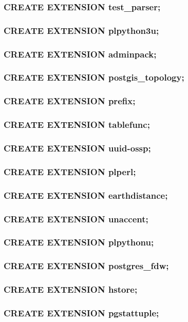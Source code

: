 \documentclass[utf8,hyperref={pdftex,colorlinks,linkcolor=black,citecolor=black,urlcolor=black,filecolor=black,plainpages=false},xcolor=table,hyperref]{beamer}
\begin{document}
\begin{frame}
	\frametitle{CREATE EXTENSION test_parser;}
\end{frame}

\begin{frame}
	\frametitle{CREATE EXTENSION plpython3u;}
\end{frame}

\begin{frame}
	\frametitle{CREATE EXTENSION adminpack;}
\end{frame}

\begin{frame}
	\frametitle{CREATE EXTENSION postgis_topology;}
\end{frame}

\begin{frame}
	\frametitle{CREATE EXTENSION prefix;}
\end{frame}

\begin{frame}
	\frametitle{CREATE EXTENSION tablefunc;}
\end{frame}

\begin{frame}
	\frametitle{CREATE EXTENSION uuid-ossp;}
\end{frame}

\begin{frame}
	\frametitle{CREATE EXTENSION plperl;}
\end{frame}

\begin{frame}
	\frametitle{CREATE EXTENSION earthdistance;}
\end{frame}

\begin{frame}
	\frametitle{CREATE EXTENSION unaccent;}
\end{frame}

\begin{frame}
	\frametitle{CREATE EXTENSION plpythonu;}
\end{frame}

\begin{frame}
	\frametitle{CREATE EXTENSION postgres_fdw;}
\end{frame}

\begin{frame}
	\frametitle{CREATE EXTENSION hstore;}
\end{frame}

\begin{frame}
	\frametitle{CREATE EXTENSION pgstattuple;}
\end{frame}
\end{document}
